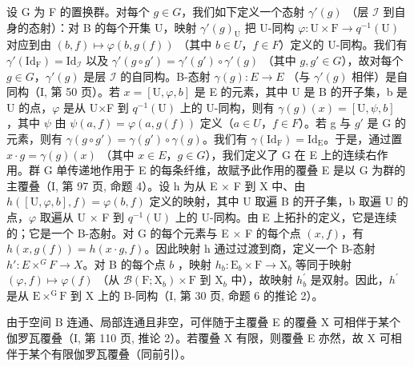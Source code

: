 设 G 为 F 的置换群。对每个 \(g \in G\)，我们如下定义一个态射 \(\gamma'(g)\) （层 \(\mathcal{I}\) 到自身的态射）：对 B 的每个开集 U，映射 \(\gamma'(g)_{\mathrm{U}}\) 把 U-同构 \(\varphi: \mathrm{U} \times \mathrm{F} \to q^{-1}(\mathrm{U})\) 对应到由 \((b, f) \mapsto \varphi(b, g(f))\) （其中 \(b \in U\)，\(f \in F\)）定义的 U-同构。我们有 \(\gamma'(\mathrm{Id}_{\mathrm{F}}) = \mathrm{Id}_{\mathcal{I}}\) 以及 \(\gamma'(g \circ g') = \gamma'(g') \circ \gamma'(g)\) （其中 \(g, g' \in G\)），故对每个 \(g \in G\)，\(\gamma'(g)\) 是层 \(\mathcal{I}\) 的自同构。B-态射 \(\gamma(g): E \to E\) （与 \(\gamma'(g)\) 相伴）是自同构（I, 第 50 页）。若 \(x = [\mathrm{U}, \varphi, b]\) 是 E 的元素，其中 U 是 B 的开子集，b 是 U 的点，\(\varphi\) 是从 U×F 到 \(q^{-1}(\mathrm{U})\) 上的 U-同构，则有 \(\gamma(g)(x) = [\mathrm{U}, \psi, b]\) ，其中 \(\psi\) 由 \(\psi(a, f) = \varphi(a, g(f))\) 定义（\(a \in U\)，\(f \in F\)）。若 g 与 \(g'\) 是 G 的元素，则有 \(\gamma(g \circ g') = \gamma(g') \circ \gamma(g)\)。我们有 \(\gamma(\mathrm{Id}_{\mathrm{F}}) = \mathrm{Id}_{\mathrm{E}}\)。于是，通过置 \(x \cdot g = \gamma(g)(x)\) （其中 \(x \in E\)，\(g \in G\)），我们定义了 G 在 E 上的连续右作用。群 G 单传递地作用于 E 的每条纤维，故赋予此作用的覆叠 E 是以 G 为群的主覆叠（I, 第 97 页, 命题 4）。设 h 为从 E × F 到 X 中、由 \(h([\mathrm{U}, \varphi, b], f) = \varphi(b, f)\) 定义的映射，其中 U 取遍 B 的开子集，b 取遍 U 的点，\(\varphi\) 取遍从 U × F 到 \(q^{-1}(\mathrm{U})\) 上的 U-同构。由 E 上拓扑的定义，它是连续的；它是一个 B-态射。对 G 的每个元素与 E × F 的每个点 \((x, f)\)，有 \(h(x, g(f)) = h(x \cdot g, f)\)。因此映射 h 通过过渡到商，定义一个 B-态射 \(h': E \times^{G} F \to X\)。对 B 的每个点 \(b\) ，映射 \(h_b\colon \mathrm{E}_b\times \mathrm{F}\to \mathrm{X}_b\) 等同于映射 \((\varphi, f)\mapsto \varphi(f)\) （从 \(\mathcal{B}(\mathrm{F};\mathrm{X}_b)\times \mathrm{F}\) 到 \(\mathrm{X}_b\) 中），故映射 \(h_b^\prime\) 是双射。因此，\(h^\prime\) 是从 \(\mathrm{E}\times^{\mathrm{G}}\mathrm{F}\) 到 X 上的 B-同构（I, 第 30 页, 命题 6 的推论 2）。

由于空间 B 连通、局部连通且非空，可伴随于主覆叠 E 的覆叠 X 可相伴于某个伽罗瓦覆叠（I, 第 110 页, 推论 2）。若覆叠 X 有限，则覆叠 E 亦然，故 X 可相伴于某个有限伽罗瓦覆叠（同前引）。

